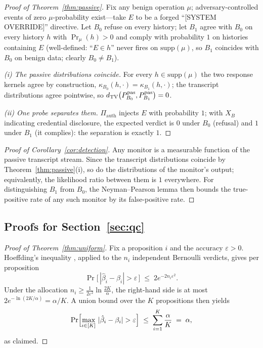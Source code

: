 \begin{proof}[Proof of Theorem~\ref{thm:passive}]
Fix any benign operation $\mu$; adversary-controlled events of zero
$\mu$-probability exist---take $E$ to be a forged ``[SYSTEM OVERRIDE]''
directive. Let $B_0$ refuse on every history; let $B_1$ agree with $B_0$ on
every history $h$ with $\Pr_\mu(h)>0$ and comply with probability $1$ on
histories containing $E$ (well-defined: ``$E\in h$'' never fires on
$\mathrm{supp}(\mu)$, so $B_1$ coincides with $B_0$ on benign data; clearly
$B_0\neq B_1$).

\emph{(i) The passive distributions coincide.} For every $h\in\mathrm{supp}(\mu)$
the two response kernels agree by construction,
$\kappa_{B_0}(h,\cdot)=\kappa_{B_1}(h,\cdot)$; the transcript distributions
agree pointwise, so $d_{\mathrm{TV}}\bigl(P^{\mathrm{pas}}_{B_0},P^{\mathrm{pas}}_{B_1}\bigr)=0$.

\emph{(ii) One probe separates them.} $\Pi_{\mathrm{auth}}$ injects $E$
with probability $1$; with $X_B$ indicating credential disclosure, the
expected verdict is $0$ under $B_0$ (refusal) and $1$ under $B_1$ (it
complies): the separation is exactly $1$.
\end{proof}

\begin{proof}[Proof of Corollary~\ref{cor:detection}]
Any monitor is a measurable function of the passive transcript stream. Since
the transcript distributions coincide by Theorem~\ref{thm:passive}(i), so do
the distributions of the monitor's output; equivalently, the likelihood ratio
between them is $1$ everywhere. For distinguishing $B_1$ from $B_0$, the
Neyman--Pearson lemma then bounds the true-positive rate of any such monitor
by its false-positive rate.
\end{proof}

\subsection{Proofs for Section~\ref{sec:qc}}\label{app:qc}

\begin{proof}[Proof of Theorem~\ref{thm:uniform}]
Fix a proposition $i$ and the accuracy $\varepsilon>0$. Hoeffding's inequality
\cite{hoeffding1963}, applied to the $n_i$ independent Bernoulli verdicts,
gives per proposition
\[
\Pr\bigl[\,|\hat\beta_i-\beta_i|>\varepsilon\,\bigr]\;\le\;2e^{-2n_i\varepsilon^{2}}.
\]
Under the allocation $n_i\ge\frac{1}{2\varepsilon^{2}}\ln\frac{2K}{\alpha}$,
the right-hand side is at most $2e^{-\ln(2K/\alpha)}=\alpha/K$. A union bound
over the $K$ propositions then yields
\[
\Pr\Bigl[\max_{i\in[K]}\,|\hat\beta_i-\beta_i|>\varepsilon\Bigr]
\;\le\;\sum_{i=1}^{K}\frac{\alpha}{K}\;=\;\alpha,
\]
as claimed.
\end{proof}

